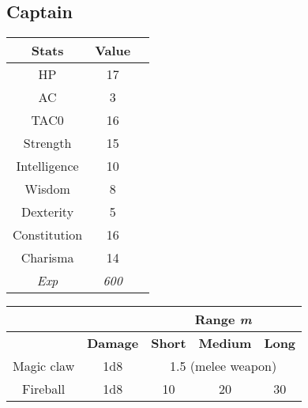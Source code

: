 \subsection{Captain}
\begin{table}[H]
  \centering
\begin{tabular}{|c|c|c|}
\hline
\rowcolor[HTML]{C0C0C0}
\textbf{Stats} & \textbf{Value } \\ \hline
HP & 17  \\ \hline
AC & 3 \\ \hline
TAC0 & 16 \\ \hline
Strength & 15  \\ \hline
Intelligence & 10 \\ \hline
Wisdom & 8 \\ \hline
Dexterity & 5  \\ \hline
Constitution & 16 \\ \hline
Charisma & 14 \\ \hline
\textit{Exp} & \textit{600} \\ \hline
\end{tabular}
\end{table}
\begin{table}[H]
\centering
\begin{tabular}{ll|c|c|c|}
\cline{3-5}
 &  & \multicolumn{3}{c|}{\cellcolor[HTML]{C0C0C0}\textbf{Range \textit{m}}} \\ \hline
\rowcolor[HTML]{C0C0C0}
\multicolumn{1}{|l|}{\cellcolor[HTML]{C0C0C0}\textbf{Weapon}} & \textbf{Damage} &\multicolumn{1}{l|}{\cellcolor[HTML]{C0C0C0}\textbf{Short}} & \textbf{Medium} & \textbf{Long} \\ \hline
\multicolumn{1}{|c|}{Magic claw} & \multicolumn{1}{c|}{1d8} & \multicolumn{3}{c|}{1.5 (melee weapon)} \\ \hline
\multicolumn{1}{|c|}{Fireball} & \multicolumn{1}{c|}{1d8} & 10 & 20 & 30 \\ \hline
\end{tabular}
\end{table}
